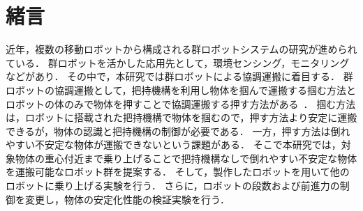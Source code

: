 \section{緒言}
近年，複数の移動ロボットから構成される群ロボットシステムの研究が進められている．
群ロボットを活かした応用先として，環境センシング，モニタリングなどがあり．
その中で，本研究では群ロボットによる協調運搬に着目する．
群ロボットの協調運搬として，把持機構を利用し物体を掴んで運搬する掴む方法とロボットの体のみで物体を押すことで協調運搬する押す方法がある~\cite{swarmBot,push-only2}．
掴む方法は，ロボットに搭載された把持機構で物体を掴むので，押す方法より安定に運搬できるが，物体の認識と把持機構の制御が必要である．
一方，押す方法は倒れやすい不安定な物体が運搬できないという課題がある．
そこで本研究では，対象物体の重心付近まで乗り上げることで把持機構なしで倒れやすい不安定な物体を運搬可能なロボット群を提案する．
そして，製作したロボットを用いて他のロボットに乗り上げる実験を行う．
さらに，ロボットの段数および前進力の制御を変更し，物体の安定化性能の検証実験を行う．
